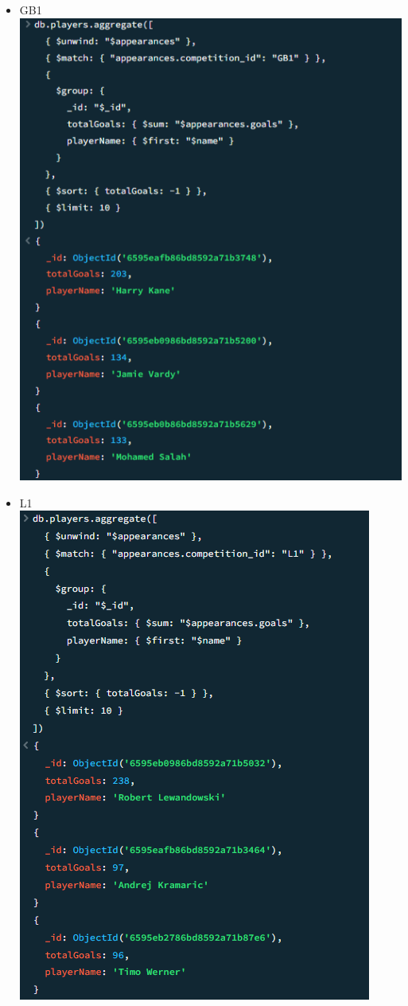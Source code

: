 \documentclass{Configuration_Files/PoliMi3i_thesis}
\begin{document}
\begin{itemize}
    \item GB1\\
    \includegraphics[scale=0.8]{Images/Queries/Competitions_statistics/top_goalscorers/GB1.png}
    \item L1\\
    \includegraphics[scale=0.8]{Images/Queries/Competitions_statistics/top_goalscorers/L1.png}

\end{itemize}
\end{document}

